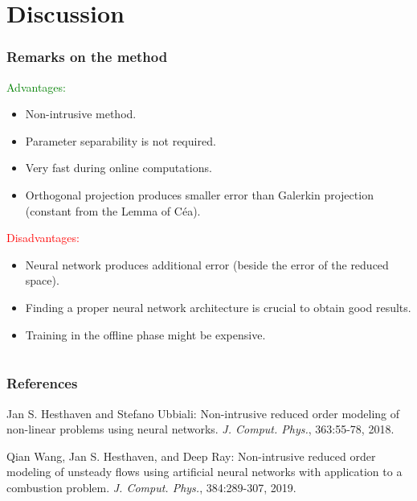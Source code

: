 \documentclass[%
]{beamer}
\begin{document}
\section{Discussion}
\begin{frame}[fragile]
	\frametitle{Remarks on the method}
	\begin{minipage}[t]{.4\textwidth}
		\textcolor{green}{Advantages:}
		\begin{itemize}
			\item Non-intrusive method.
			\item Parameter separability is not required.
			\item Very fast during online computations.
			\item Orthogonal projection produces smaller error than Galerkin projection (constant from the Lemma of Céa).
		\end{itemize}
	\end{minipage}
	\hspace{0.6cm}
	\vrule
	\hspace{0.6cm}
	\begin{minipage}[t]{.4\textwidth}
		\textcolor{red}{Disadvantages:}
		\begin{itemize}
			\item Neural network produces additional error (beside the error of the reduced space).
			\item Finding a proper neural network architecture is crucial to obtain good results.
			\item Training in the offline phase might be expensive.
		\end{itemize}
	\end{minipage}
\end{frame}
\section*{}
\begin{frame}[fragile]
	\frametitle{References}
	\begin{thebibliography}{99}
		Jan S. Hesthaven and Stefano Ubbiali: Non-intrusive reduced order modeling of non-linear problems using neural networks.
		\newblock \textit{J. Comput. Phys.}, 363:55-78, 2018.
		
		Qian Wang, Jan S. Hesthaven, and Deep Ray: Non-intrusive reduced order modeling of unsteady flows using artificial neural networks with application to a combustion problem.
		\newblock \textit{J. Comput. Phys.}, 384:289-307, 2019.
	\end{thebibliography}
\end{frame}
\end{document}
